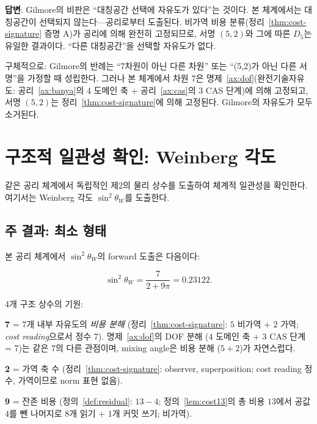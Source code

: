 \documentclass[entropy,article,submit,pdftex,oneauthor]{Definitions/mdpi}
\begin{document}
\textbf{답변}: Gilmore의 비판은 ``대칭공간 선택에 자유도가 있다''는 것이다. 본 체계에서는 대칭공간이 선택되지 않는다---공리로부터 도출된다. 비가역 비용 분류(정리~\ref{thm:cost-signature} 증명 A)가 공리에 의해 완전히 고정되므로, 서명 $(5,2)$와 그에 따른 $D_5$는 유일한 결과이다. ``다른 대칭공간''을 선택할 자유도가 없다.

구체적으로: Gilmore의 반례는 ``7차원이 아닌 다른 차원'' 또는 ``(5,2)가 아닌 다른 서명''을 가정할 때 성립한다. 그러나 본 체계에서 차원 7은 명제~\ref{ax:dof}(완전기술자유도: 공리~\ref{ax:banya}의 4 도메인 축 + 공리~\ref{ax:cas}의 3 CAS 단계)에 의해 고정되고, 서명 $(5,2)$는 정리~\ref{thm:cost-signature}에 의해 고정된다. Gilmore의 자유도가 모두 소거된다.

\section{구조적 일관성 확인: Weinberg 각도}
\label{sec:prediction}

같은 공리 체계에서 독립적인 제2의 물리 상수를 도출하여 체계적 일관성을 확인한다. 여기서는 Weinberg 각도 $\sin^2\theta_W$를 도출한다.

\subsection{주 결과: 최소 형태}

본 공리 체계에서 $\sin^2\theta_W$의 forward 도출은 다음이다:
\begin{linenomath}
\begin{equation}
\boxed{\sin^2\theta_W = \frac{7}{2 + 9\pi} = 0.23122.}
\label{eq:weinberg-main}
\end{equation}
\end{linenomath}

4개 구조 상수의 기원:

\textbf{7} = 7개 내부 자유도의 \emph{비용 분해} (정리~\ref{thm:cost-signature}: $5$ 비가역 + $2$ 가역; \emph{cost reading}으로서 정수 7). 명제~\ref{ax:dof}의 DOF 분해 ($4$ 도메인 축 + $3$ CAS 단계 = 7)는 같은 7의 다른 관점이며, mixing angle은 비용 분해 ($5+2$)가 자연스럽다.

\textbf{2} = 가역 축 수 (정리~\ref{thm:cost-signature}: observer, superposition; cost reading 정수, 가역이므로 norm 표현 없음).

\textbf{9} = 잔존 비용 (정의~\ref{def:residual}: $13 - 4$; 정의~\ref{lem:cost13}의 총 비용 $13$에서 공값 $4$를 뺀 나머지로 $8$개 읽기 + $1$개 커밋 쓰기; 비가역).
\end{document}
